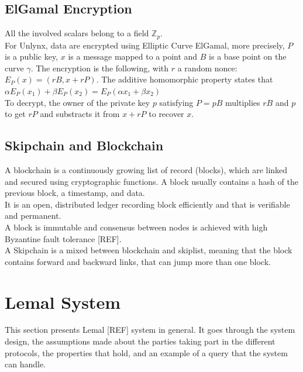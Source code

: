 \documentclass{article}
\begin{document}
\subsection{ElGamal Encryption}
All the involved scalars belong to a field $\mathbb{Z}_p$.\\
For Unlynx, data are encrypted using Elliptic Curve ElGamal, more precisely, $P$ is a public key, $x$ is a message mapped to a point and $B$ is a base point on the curve $\gamma$. The encryption is the following, with $r$ a random nonce:\\
$E_P(x) = (rB,x+rP)$. The additive homomorphic property states that $\alpha E_P(x_1) + \beta E_P(x_2) = E_P(\alpha x_1+ \beta x_2)$\\
To decrypt, the owner of the private key $p$ satisfying $P = pB$ multiplies $rB$ and $p$ to get $rP$ and substracts it from $x + rP$ to recover $x$.\\

\subsection{Skipchain and Blockchain}
A blockchain is a continuously growing list of record (blocks), which are linked and secured using cryptographic functions. A block usually contains a hash of the previous block, a timestamp, and data.\\
It is an open, distributed ledger recording block efficiently and that is verifiable and permanent.\\
A block is immutable and consensus between nodes is achieved with high Byzantine fault tolerance [REF].\\
A Skipchain is a mixed between blockchain and skiplist, meaning that the block contains forward and backward links, that can jump more than one block.\\


\section{Lemal System}
This section presents Lemal [REF] system in general. It goes through the system design, the assumptions made about the parties taking part in the different protocols, the properties that hold, and an example of a query that the system can handle.\\
\end{document}
